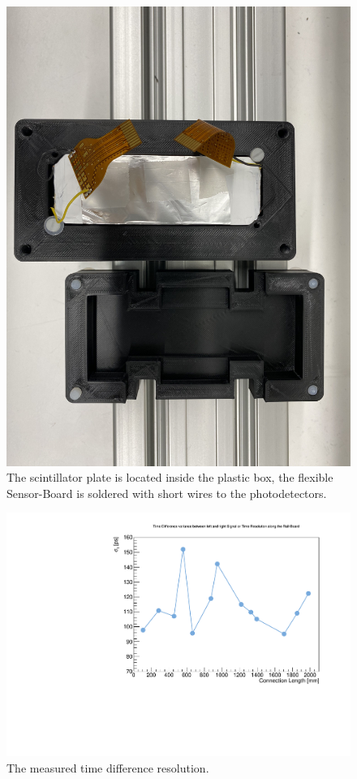 \documentclass[../BTOF_summary.tex]{subfiles}
\begin{document}
\begin{figure}[h!]
    \centering
    \includegraphics[scale=0.2, angle=90]{Pictures/Box_SciTile1.pdf}
    \caption{The scintillator plate is located inside the plastic box, the flexible Sensor-Board is soldered with short wires to the photodetectors.}
    \label{fig:Box_SciTile1}
\end{figure}

\begin{figure}[h!]
    \centering
    \includegraphics[scale=0.5]{Pictures/TimeRes.pdf}
    \caption{The measured time difference resolution.}
    \label{fig:TR}
\end{figure}
\end{document}
